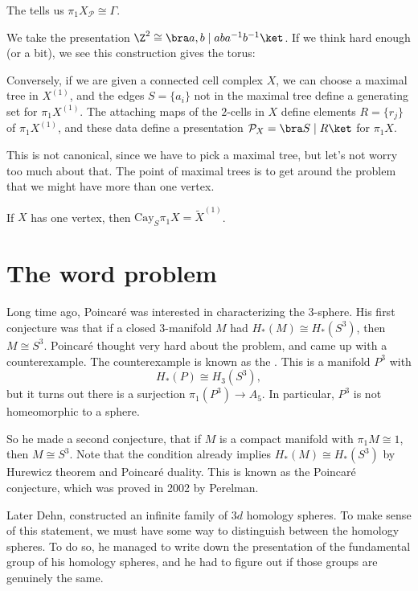 \documentclass[a4paper]{article}
\newcommand\Cay{\mathrm{Cay}}
\begin{document}
The  tells us $\pi_1 X_{\mathcal{P}} \cong \Gamma$.

\begin{eg}
  We take the presentation $\Z^2 \cong \bra a, b \mid aba^{-1}b^{-1}\ket$. If we think hard enough (or a bit), we see this construction gives the torus:


\end{eg}

Conversely, if we are given a connected cell complex $X$, we can choose a maximal tree in $X^{(1)}$, and the edges $S = \{a_i\}$ not in the maximal tree define a generating set for $\pi_1 X^{(1)}$. The attaching maps of the $2$-cells in $X$ define elements $R = \{r_j\}$ of $\pi_1 X^{(1)}$, and these data define a presentation $\mathcal{P}_X = \bra S \mid R\ket$ for $\pi_1 X$.

This is not canonical, since we have to pick a maximal tree, but let's not worry too much about that. The point of maximal trees is to get around the problem that we might have more than one vertex.

\begin{ex}
  If $X$ has one vertex, then $\Cay_S \pi_1 X = \tilde{X}^{(1)}$.
\end{ex}

\section{The word problem}
Long time ago, Poincar\'e was interested in characterizing the $3$-sphere. His first conjecture was that if a closed $3$-manifold $M$ had $H_*(M) \cong H_*(S^3)$, then $M \cong S^3$. Poincar\'e thought very hard about the problem, and came up with a counterexample. The counterexample is known as the . This is a manifold $P^3$ with
\[
  H_*(P) \cong H_3(S^3),
\]
but it turns out there is a surjection $\pi_1(P^3) \to A_5$. In particular, $P^3$ is not homeomorphic to a sphere.

So he made a second conjecture, that if $M$ is a compact manifold with $\pi_1M \cong 1$, then $M \cong S^3$. Note that the condition already implies $H_*(M) \cong H_*(S^3)$ by Hurewicz theorem and Poincar\'e duality. This is known as the Poincar\'e conjecture, which was proved in 2002 by Perelman. %

Later Dehn, constructed an infinite family of $3d$ homology spheres. To make sense of this statement, we must have some way to distinguish between the homology spheres. To do so, he managed to write down the presentation of the fundamental group of his homology spheres, and he had to figure out if those groups are genuinely the same.
\end{document}
